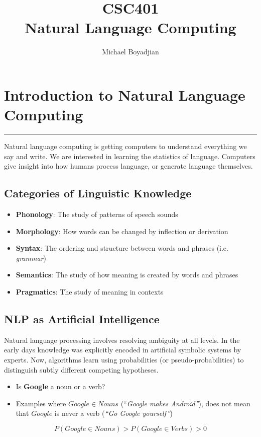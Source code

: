 \documentclass[11pt]{article}
\begin{document}
\title{CSC401  \\ Natural Language Computing}
\author{Michael Boyadjian}
\maketitle
\pagebreak

\tableofcontents

\pagebreak

\bigskip
\bigskip
\bigskip


\section{Introduction to Natural Language Computing}
\hrule \vspace{15pt}

Natural language computing is getting computers to understand everything we say and write.  We are interested in learning the statistics of language.  Computers
give insight into how humans process language, or generate language themselves.
\subsection{Categories of Linguistic Knowledge}
\begin{itemize}
\item \textbf{Phonology}: The study of patterns of speech sounds
\item \textbf{Morphology}: How words can be changed by inflection or derivation
\item \textbf{Syntax}: The ordering and structure between words and phrases (i.e. \textit{grammar})
\item \textbf{Semantics}: The study of how meaning is created by words and phrases
\item \textbf{Pragmatics}: The study of meaning in contexts
\end{itemize}

\subsection{NLP as Artificial Intelligence}
Natural language processing involves resolving ambiguity at all levels. In the early days knowledge was explicitly encoded in artificial symbolic systems by experts. Now, algorithms learn using probabilities (or pseudo-probabilities)
to distinguish subtly different competing hypotheses.
\begin{itemize}
\item Is \textbf{Google} a noun or a verb?
\item Examples where $Google \in Nouns$ (“\textit{Google makes Android”}),
does not mean that $Google$ is never a verb (\textit{“Go Google yourself”})
\end{itemize}
$$ P(Google \in Nouns) > P(Google \in Verbs) > 0 $$
\end{document}

